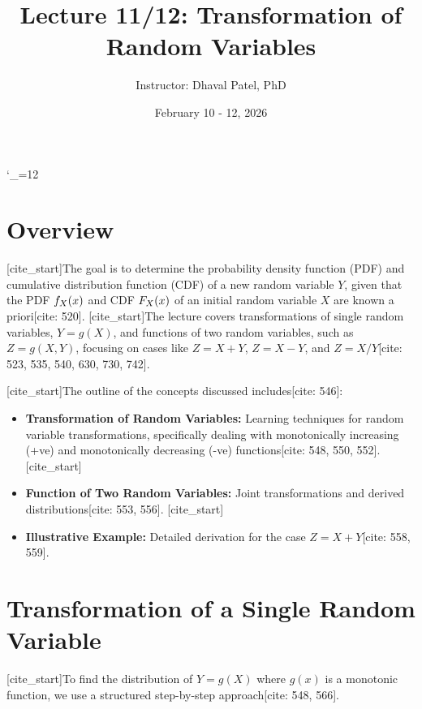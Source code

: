 \documentclass[11pt]{article}
\title{\textbf{Lecture 11/12: Transformation of Random Variables}}
\author{Instructor: Dhaval Patel, PhD}
\date{February 10 - 12, 2026}
\begin{document}
\catcode`\_=12 %

\maketitle

\section{Overview}
[cite_start]The goal is to determine the probability density function (PDF) and cumulative distribution function (CDF) of a new random variable $Y$, given that the PDF $f\sb{X}(x)$ and CDF $F\sb{X}(x)$ of an initial random variable $X$ are known a priori[cite: 520]. [cite_start]The lecture covers transformations of single random variables, $Y = g(X)$, and functions of two random variables, such as $Z = g(X, Y)$, focusing on cases like $Z = X + Y$, $Z = X - Y$, and $Z = X/Y$[cite: 523, 535, 540, 630, 730, 742].

[cite_start]The outline of the concepts discussed includes[cite: 546]:
\begin{itemize}
    [cite_start]\item \leavevmode \textbf{Transformation of Random Variables:} Learning techniques for random variable transformations, specifically dealing with monotonically increasing (+ve) and monotonically decreasing (-ve) functions[cite: 548, 550, 552].
    [cite_start]\item \leavevmode \textbf{Function of Two Random Variables:} Joint transformations and derived distributions[cite: 553, 556].
    [cite_start]\item \leavevmode \textbf{Illustrative Example:} Detailed derivation for the case $Z = X + Y$[cite: 558, 559].
\end{itemize}

\section{Transformation of a Single Random Variable}
[cite_start]To find the distribution of $Y = g(X)$ where $g(x)$ is a monotonic function, we use a structured step-by-step approach[cite: 548, 566].
\end{document}
